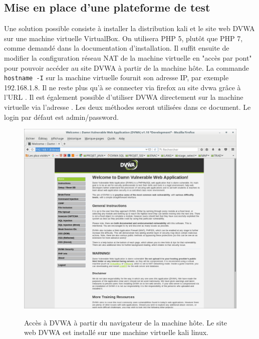 \subsection*{Mise en place d'une plateforme de test}

Une solution possible consiste à installer la distribution kali et le site web DVWA sur une machine virtuelle VirtualBox. On utilisera PHP 5, plutôt que PHP 7, comme demandé dans la documentation d'installation.
Il suffit ensuite de modifier la configuration réseau NAT de la machine virtuelle en "accès par pont" pour pouvoir accéder au site DVWA à partir de la machine hôte.
La commande \texttt{hostname -I} sur la machine virtuelle fournit son adresse IP, par exemple 192.168.1.8. Il ne reste plus qu'à se connecter via firefox
au site dvwa grâce à l'URL . Il est également possible d'utiliser DVWA directement sur la machine virtuelle via l'adresse . Les deux méthodes seront utilisées dans ce document. Le login par défaut est admin/password.

 \begin{figure}[!h]
 	\begin{center}
 		\label{}
 		\includegraphics[scale=\scaledvwa]{images/dvwa.png}
 		\caption{Accès à DVWA à partir du navigateur de la machine hôte. Le site web DVWA est installé sur une machine virtuelle kali linux.}
 	\end{center}
 \end{figure}


\clearpage